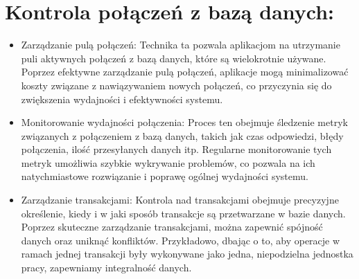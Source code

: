 \documentclass[letterpaper,10pt,polish]{sphinxmanual}
\begin{document}
\section{Kontrola połączeń z bazą danych:}
\label{\detokenize{rozdzialy/rozdzial1:kontrola-polaczen-z-baza-danych}}\begin{itemize}
\item {} 
\sphinxAtStartPar
Zarządzanie pulą połączeń: Technika ta pozwala aplikacjom na utrzymanie puli aktywnych połączeń z bazą danych, które są wielokrotnie używane. Poprzez efektywne zarządzanie pulą połączeń, aplikacje mogą minimalizować koszty związane z nawiązywaniem nowych połączeń, co przyczynia się do zwiększenia wydajności i efektywności systemu.

\item {} 
\sphinxAtStartPar
Monitorowanie wydajności połączenia: Proces ten obejmuje śledzenie metryk związanych z połączeniem z bazą danych, takich jak czas odpowiedzi, błędy połączenia, ilość przesyłanych danych itp. Regularne monitorowanie tych metryk umożliwia szybkie wykrywanie problemów, co pozwala na ich natychmiastowe rozwiązanie i poprawę ogólnej wydajności systemu.

\item {} 
\sphinxAtStartPar
Zarządzanie transakcjami: Kontrola nad transakcjami obejmuje precyzyjne określenie, kiedy i w jaki sposób transakcje są przetwarzane w bazie danych. Poprzez skuteczne zarządzanie transakcjami, można zapewnić spójność danych oraz uniknąć konfliktów. Przykładowo, dbając o to, aby operacje w ramach jednej transakcji były wykonywane jako jedna, niepodzielna jednostka pracy, zapewniamy integralność danych.

\end{itemize}
\end{document}
